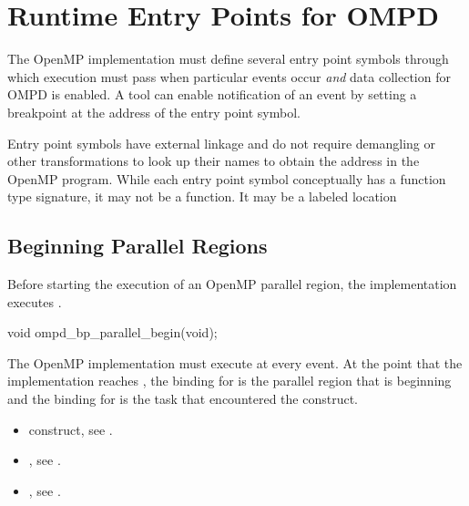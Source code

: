 \section{Runtime Entry Points for OMPD}
\label{subsec:runtime-entry-points-for-ompd}

The OpenMP implementation must define several entry point symbols 
through which execution must pass when particular events occur
\emph{and} data collection for OMPD is enabled. A tool can enable
notification of an event by setting a breakpoint at the address of 
the entry point symbol.

Entry point symbols have external  linkage and do not
require demangling or other transformations to look up their 
names to obtain the address in the OpenMP program. While each 
entry point symbol conceptually has a function type signature, 
it may not be a function. It may be a labeled location



\subsection{Beginning Parallel Regions}
\label{subsubsec:ompd_bp_parallel_begin}

\summary
Before starting the execution of an OpenMP parallel region, the 
implementation executes .

\format
\begin{cspecific}
\begin{ompSyntax}
void ompd_bp_parallel_begin(void);
\end{ompSyntax}
\end{cspecific}

\descr
The OpenMP implementation must execute  
at every  event. At the point that the implementation 
reaches , the binding for 
 is the parallel region that is 
beginning and the binding for 
is the task that encountered the  construct.

\crossreferences
\begin{itemize}
\item {} construct, see .

\item {}, 
see .

\item {}, 
see .
\end{itemize}



